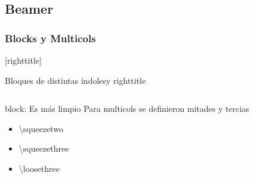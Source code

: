 
\subsection{Beamer}
	\subsubsection{Blocks y Multicols}


{[righttitle]{}
\begin{frame}{Bloques de distintas índoles\footnotemark[1]y righttitle}
				{}
%
\centering
	\begin{columns}
		\column{\squeezethree}
		\centering
			\begin{block}{block:  Es más limpio}
				Para multicols se  definieron mitades y tercias
				\begin{itemize} \itemsep.5em
					\item \backslash{squeezetwo}
					\item \backslash{squeezethree}
					\item \backslash{loosethree}
				\end{itemize}
			\end{block}
		\column{1.5\squeezethree}
		

\end{columns}
\end{frame}}
